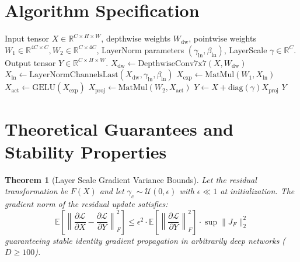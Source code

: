 \documentclass[11pt,a4paper]{article}
\newtheorem{theorem}{Theorem}
\theoremstyle{definition}
\begin{document}
\section{Algorithm Specification}

\begin{algorithm}[H]
\caption{ConvNeXt Block Forward Evaluation}
\label{alg:convnext}
\begin{algorithmic}[1]
\Require Input tensor $X \in \mathbb{R}^{C \times H \times W}$, depthwise weights $W_{\text{dw}}$, pointwise weights $W_1 \in \mathbb{R}^{4C \times C}, W_2 \in \mathbb{R}^{C \times 4C}$, LayerNorm parameters $(\gamma_{\text{ln}}, \beta_{\text{ln}})$, LayerScale $\gamma \in \mathbb{R}^C$.
\Ensure Output tensor $Y \in \mathbb{R}^{C \times H \times W}$.
\State $X_{\text{dw}} \gets \text{DepthwiseConv7x7}(X, W_{\text{dw}})$
\State $X_{\text{ln}} \gets \text{LayerNormChannelsLast}(X_{\text{dw}}, \gamma_{\text{ln}}, \beta_{\text{ln}})$
\State $X_{\text{exp}} \gets \text{MatMul}(W_1, X_{\text{ln}})$ 
\State $X_{\text{act}} \gets \text{GELU}(X_{\text{exp}})$
\State $X_{\text{proj}} \gets \text{MatMul}(W_2, X_{\text{act}})$ 
\State $Y \gets X + \text{diag}(\gamma) X_{\text{proj}}$
\State \Return $Y$
\end{algorithmic}
\end{algorithm}

\section{Theoretical Guarantees and Stability Properties}

\begin{theorem}[Layer Scale Gradient Variance Bounds]
\label{thm:layerscale}
Let the residual transformation be $F(X)$ and let $\gamma_c \sim \mathcal{U}(0, \epsilon)$ with $\epsilon \ll 1$ at initialization. The gradient norm of the residual update satisfies:
\begin{equation}
\mathbb{E}\left[ \left\| \frac{\partial \mathcal{L}}{\partial X} - \frac{\partial \mathcal{L}}{\partial Y} \right\|_F^2 \right] \le \epsilon^2 \cdot \mathbb{E}\left[ \left\| \frac{\partial \mathcal{L}}{\partial Y} \right\|_F^2 \right] \cdot \sup \|J_F\|_2^2
\end{equation}
guaranteeing stable identity gradient propagation in arbitrarily deep networks ($D \ge 100$).
\end{theorem}
\end{document}
